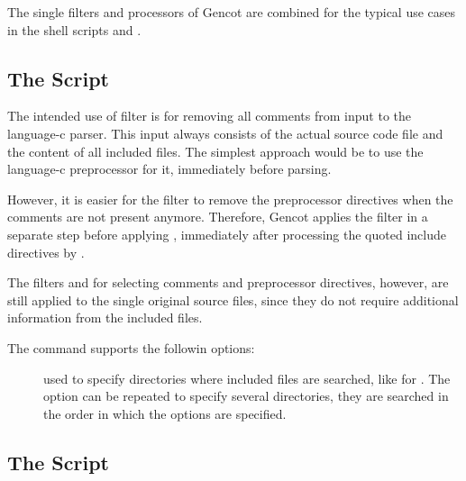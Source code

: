 The single filters and processors of Gencot are combined for the typical use cases in the shell scripts
 and .

\subsection{The  Script}
\label{impl-all-gencot}





The intended use of filter  is for removing all comments from input to the language-c parser.
This input always consists of the actual source code file and the content of all included files. The simplest approach
would be to use the language-c preprocessor for it, immediately before parsing. 

However, it is easier for the filter  to remove the preprocessor directives when the comments are 
not present anymore. Therefore, Gencot applies the filter  in a separate step before applying
, immediately after processing the quoted include directives by .
 
The filters  and  for selecting comments and preprocessor directives, however, are
still applied to the single original source files, since they do not require additional information from the included files.




The  command supports the followin options:
\begin{description}
\item[] used to specify directories where included files are searched, like for . The 
option can be repeated to specify several directories, they are searched in the order in which the options
are specified.

\item[]

\item[]

\end{description}



\subsection{The  Script}
\label{impl-all-parmod}

